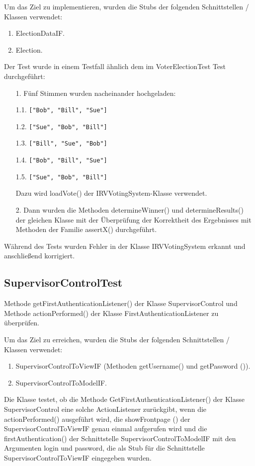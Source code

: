 \documentclass[parskip=full]{scrartcl}
\begin{document}
Um das Ziel zu implementieren, wurden die Stubs  der folgenden Schnittstellen / Klassen verwendet: 
\begin{enumerate}
	\item ElectionDataIF. 
	\item Election. 
\end{enumerate}

Der Test wurde in einem Testfall ähnlich dem im VoterElectionTest Test durchgeführt: 

\begin{enumerate}
	\item[1.] Fünf Stimmen wurden nacheinander hochgeladen: 
	\item[1.1.] \verb|["Bob", "Bill", "Sue"]| 
	\item[1.2.] \verb|["Sue", "Bob", "Bill"]| 
	\item[1.3.] \verb|["Bill", "Sue", "Bob"]| 
	\item[1.4.] \verb|["Bob", "Bill", "Sue"]|
	\item[1.5.] \verb|["Sue", "Bob", "Bill"]|

	Dazu wird loadVote() der IRVVotingSystem-Klasse verwendet. 
	\item[2.] Dann wurden die Methoden determineWinner() und determineResults() der gleichen Klasse mit der Überprüfung der Korrektheit des Ergebnisses mit Methoden der Familie assertX() durchgeführt. 
\end{enumerate}

Während des Tests wurden Fehler in der Klasse IRVVotingSystem erkannt und anschließend korrigiert.

\subsection{SupervisorControlTest} 
Methode getFirstAuthenticationListener() der Klasse SupervisorControl und Methode actionPerformed() der Klasse FirstAuthenticationListener zu überprüfen. 

Um das Ziel zu erreichen, wurden die Stubs der folgenden Schnittstellen / Klassen verwendet: 
\begin{enumerate}
	\item SupervisorControlToViewIF (Methoden getUsername() und getPassword ()). 
	\item SupervisorControlToModelIF. 
\end{enumerate}

Die Klasse testet, ob die Methode GetFirstAuthenticationListener() der Klasse SupervisorControl eine solche ActionListener zurückgibt, wenn die actionPerformed()  ausgeführt wird, die showFrontpage () der SupervisorControlToViewIF genau einmal aufgerufen wird und die firstAuthentication() der Schnittstelle SupervisorControlToModelIF mit den Argumenten login und password, die als Stub für die Schnittstelle SupervisorControlToViewIF eingegeben wurden. 
\end{document}
